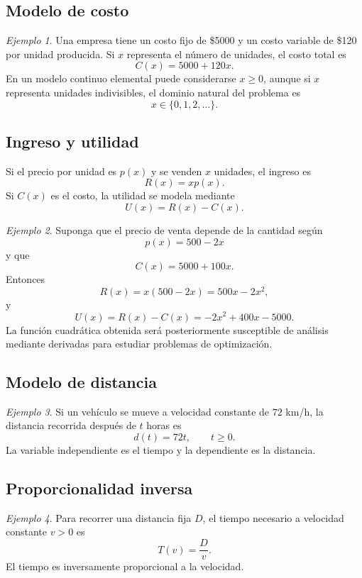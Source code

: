 \documentclass[12pt]{article}
\theoremstyle{remark}
\newtheorem{ejemplo}{Ejemplo}[section]
\begin{document}
\subsection*{Modelo de costo}

\begin{ejemplo}
Una empresa tiene un costo fijo de \$5000 y un costo variable de \$120 por
unidad producida. Si $x$ representa el número de unidades, el costo total es
\[
C(x)=5000+120x.
\]
En un modelo continuo elemental puede considerarse $x\geq0$, aunque si $x$
representa unidades indivisibles, el dominio natural del problema es
\[
x\in\{0,1,2,\ldots\}.
\]
\end{ejemplo}

\subsection*{Ingreso y utilidad}

Si el precio por unidad es $p(x)$ y se venden $x$ unidades, el ingreso es
\[
R(x)=xp(x).
\]
Si $C(x)$ es el costo, la utilidad se modela mediante
\[
U(x)=R(x)-C(x).
\]

\begin{ejemplo}
Suponga que el precio de venta depende de la cantidad según
\[
p(x)=500-2x
\]
y que
\[
C(x)=5000+100x.
\]
Entonces
\[
R(x)=x(500-2x)=500x-2x^2,
\]
y
\[
U(x)=R(x)-C(x)
=-2x^2+400x-5000.
\]
La función cuadrática obtenida será posteriormente susceptible de análisis
mediante derivadas para estudiar problemas de optimización.
\end{ejemplo}

\subsection*{Modelo de distancia}

\begin{ejemplo}
Si un vehículo se mueve a velocidad constante de $72$ km/h, la distancia
recorrida después de $t$ horas es
\[
d(t)=72t,\qquad t\geq0.
\]
La variable independiente es el tiempo y la dependiente es la distancia.
\end{ejemplo}

\subsection*{Proporcionalidad inversa}

\begin{ejemplo}
Para recorrer una distancia fija $D$, el tiempo necesario a velocidad constante
$v>0$ es
\[
T(v)=\frac{D}{v}.
\]
El tiempo es inversamente proporcional a la velocidad.
\end{ejemplo}
\end{document}
